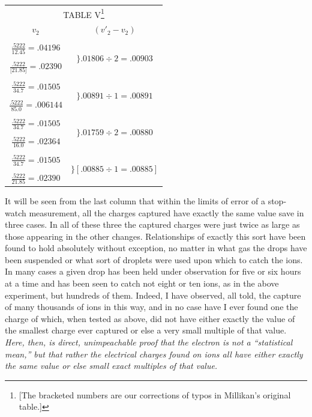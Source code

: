 \begin{table}[htp]
\centering
\begin{minipage}{\textwidth}
\centering
\begin{tabular}{ c c }
  \multicolumn{2}{c}{TABLE V\footnote{[The bracketed numbers are our corrections of typos
  in Millikan's original table.]}}\\
  $v_2$ & $ (v'_2 - v_2)$\\
  &\\
  $\frac{.5222}{12.45} = .04196$ & \multirow{3}{*}{$\biggr\} .01806 \div 2 = .00903$}\\
  &\\
  $\frac{.5222}{{[}21.85{]}} = .02390$ & \multirow{3}{*}{$\biggr\} .00885 \div 1 = .00885$}\\
  &\\
  $\frac{.5222}{34.7} = .01505$ &\multirow{3}{*}{$\biggr\} .00891 \div 1 = .00891$}\\
  &\\
  $\frac{.5222}{85.0} = .006144$ &\multirow{3}{*}{$\biggr\} .00891 \div 1 = .00891$}\\
  &\\
  $\frac{.5222}{34.7} = .01505$ &\multirow{3}{*}{$\biggr\} .01759 \div 2 = .00880$}\\
  &\\
  $\frac{.5222}{16.0} = .02364$ &\multirow{3}{*}{$\biggr\} .01759 \div 2 = .00880$}\\
  &\\
  $\frac{.5222}{34.7} = .01505$ &\multirow{3}{*}{$\biggr\} [.00885 \div 1 = .00885]$}\\
  &\\
  $\frac{.5222}{21.85} = .02390$ &\\
\end{tabular}
\end{minipage}
\end{table}

It will be seen from the last column that within the limits of error of
a stop-watch measurement, all the charges captured have exactly the same
value save in three cases. In all of these three the captured charges
were just twice as large as those appearing in the other changes.
Relationships of exactly this sort have been found to hold absolutely
without exception, no matter in what gas the drops have been suspended
or what sort of droplets were used upon which to catch the ions. In many
cases a given drop has been held under observation for five or six hours
at a time and has been seen to catch not eight or ten ions, as in the
above experiment, but hundreds of them. Indeed, I have observed, all
told, the capture of many thousands of ions in this way, and in no case
have I ever found one the charge of which, when tested as above, did not
have either exactly the value of the smallest charge ever captured or
else a very small multiple of that value. \emph{Here, then, is direct,
unimpeachable proof that the electron is not a ``statistical mean,'' but
that rather the electrical charges found on ions all have either exactly
the same value or else small exact multiples of that value.}

